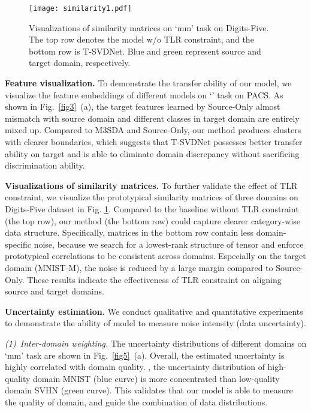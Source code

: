 \documentclass[10pt,twocolumn,letterpaper]{article}
\begin{document}
\begin{figure}
	\centering
	\texttt{[image: similarity1.pdf]}\\
	\caption{Visualizations of similarity matrices on `mm' task on Digits-Five. The top row denotes the model w/o TLR constraint, and the bottom row is T-SVDNet. Blue and green represent source and target domain, respectively.}
	\label{fig4}
	\vspace{-1em}
\end{figure}
\textbf{Feature visualization.} 
To demonstrate the transfer ability of our model, we visualize the feature embeddings of different models on `' task on PACS. As shown in Fig.~\ref{fig3}~(a), the target features learned by Source-Only almost mismatch with source domain and different classes in target domain are entirely mixed up. Compared to M3SDA and Source-Only, our method produces clusters with clearer boundaries, which suggests that T-SVDNet possesses better transfer ability on target and is able to eliminate domain discrepancy without sacrificing discrimination ability.\par
\textbf{Visualizations of similarity matrices.} 
To further validate the effect of TLR constraint, we visualize the prototypical similarity matrices of three domains on Digits-Five dataset in Fig. \ref{fig4}. Compared to the baseline without TLR constraint (the top row), our method (the bottom row) could capture clearer category-wise data structure. Specifically, matrices in the bottom row contain less domain-specific noise, because we search for a lowest-rank structure of tensor and enforce prototypical correlations to be consistent across domains. Especially on the target domain (MNIST-M), the noise is reduced by a large margin compared to Source-Only. These results indicate the effectiveness of TLR constraint on aligning source and target domains.\par
\textbf{Uncertainty estimation.} We conduct qualitative and quantitative experiments to demonstrate the ability of model to measure noise intensity (data uncertainty).\par
\textit{(1)~Inter-domain weighting.}  The uncertainty distributions of different domains on `mm' task are shown in Fig.~\ref{fig5}~(a). Overall, the estimated uncertainty is highly correlated with domain quality. \eg, the uncertainty distribution of high-quality domain MNIST (blue curve) is more concentrated than low-quality domain SVHN (green curve). This validates that our model is able to measure the quality of domain, and guide the combination of data distributions.\par
\end{document}
